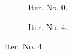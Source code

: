 \documentclass[a4paper,12pt]{amsart}
\numberwithin{equation}{section}
\begin{document}
\begin{figure}[h!]
\centering
\begin{subfigure}[t]{0.49\textwidth}
    \caption{Iter. No. 0.}
\end{subfigure}
	\hfill
\begin{subfigure}[t]{0.49\textwidth}
    \caption{Iter. No. 4.}
\end{subfigure}


\end{figure}
\end{document}
